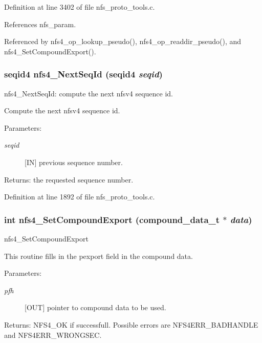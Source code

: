 Definition at line 3402 of file nfs\_\-proto\_\-tools.c.

References nfs\_\-param.

Referenced by nfs4\_\-op\_\-lookup\_\-pseudo(), nfs4\_\-op\_\-readdir\_\-pseudo(), and nfs4\_\-Set\-Compound\-Export().
\subsubsection{\setlength{\rightskip}{0pt plus 5cm}seqid4 nfs4\_\-Next\-Seq\-Id (seqid4 {\em seqid})}\label{nfs__proto__tools_8c_a15}


nfs4\_\-Next\-Seq\-Id: compute the next nfsv4 sequence id.

Compute the next nfsv4 sequence id.

\begin{Desc}
\item[Parameters:]
\begin{description}
\item[{\em seqid}][IN] previous sequence number.\end{description}
\end{Desc}
\begin{Desc}
\item[Returns:]the requested sequence number. \end{Desc}


Definition at line 1892 of file nfs\_\-proto\_\-tools.c.
\subsubsection{\setlength{\rightskip}{0pt plus 5cm}int nfs4\_\-Set\-Compound\-Export (compound\_\-data\_\-t $\ast$ {\em data})}\label{nfs__proto__tools_8c_a10}


nfs4\_\-Set\-Compound\-Export

This routine fills in the pexport field in the compound data.

\begin{Desc}
\item[Parameters:]
\begin{description}
\item[{\em pfh}][OUT] pointer to compound data to be used.\end{description}
\end{Desc}
\begin{Desc}
\item[Returns:]NFS4\_\-OK if successfull. Possible errors are NFS4ERR\_\-BADHANDLE and NFS4ERR\_\-WRONGSEC. \end{Desc}


